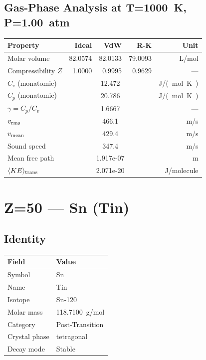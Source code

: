 \documentclass[11pt,a4paper]{article}
\begin{document}
\subsection{Gas-Phase Analysis at T=\SI{1000}{K}, P=\SI{1.00}{atm}}
\begin{tabular}{lrrrr}
  \toprule
  Property & Ideal & VdW & R-K & Unit \\
  \midrule
  Molar volume & 82.0574 & 82.0133 & 79.0093 & \si{L/mol} \\
  Compressibility $Z$ & 1.0000 & 0.9995 & 0.9629 & --- \\
  \midrule
  $C_v$ (monatomic) & \multicolumn{3}{c}{12.472} & \si{J/(mol.K)} \\
  $C_p$ (monatomic) & \multicolumn{3}{c}{20.786} & \si{J/(mol.K)} \\
  $\gamma = C_p/C_v$ & \multicolumn{3}{c}{1.6667} & --- \\
  $v_{\rm rms}$ & \multicolumn{3}{c}{466.1} & \si{m/s} \\
  $v_{\rm mean}$ & \multicolumn{3}{c}{429.4} & \si{m/s} \\
  Sound speed & \multicolumn{3}{c}{347.4} & \si{m/s} \\
  Mean free path & \multicolumn{3}{c}{1.917e-07} & \si{m} \\
  $\langle KE \rangle_{\rm trans}$ & \multicolumn{3}{c}{2.071e-20} & \si{J/molecule} \\
  \bottomrule
\end{tabular}

\newpage

\section{Z=50 --- Sn (Tin)}
\label{sec:Z50}

\subsection{Identity}
\begin{tabular}{ll}
  \toprule
  Field & Value \\
  \midrule
  Symbol & Sn \\
  Name & Tin \\
  Isotope & Sn-120 \\
  Molar mass & \SI{118.7100}{g/mol} \\
  Category & Post-Transition \\
  Crystal phase & tetragonal \\
  Decay mode & Stable \\
  \bottomrule
\end{tabular}
\end{document}

